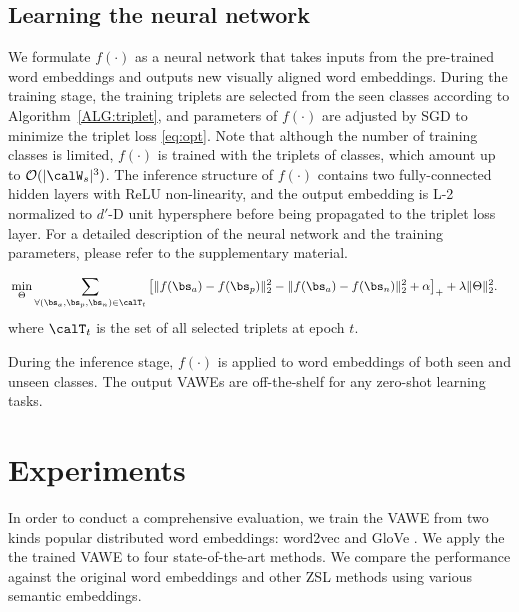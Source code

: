 \documentclass{bmvc2k}
\begin{document}
%


\subsection{Learning the neural network}
We formulate $f(\cdot)$ as a neural network that takes inputs from the pre-trained word embeddings and outputs new visually aligned word embeddings. During the training stage, the training triplets are selected from the seen classes according to Algorithm~\ref{ALG:triplet}, and parameters of $f(\cdot)$ are adjusted by SGD to minimize the triplet loss \eqref{eq:opt}. Note that although the number of training classes is limited, $f(\cdot)$ is trained with the triplets of classes, which amount up to $\mathcal{O} (| \calW_s |^3)$. The inference structure of $f(\cdot)$ contains two fully-connected hidden layers with ReLU non-linearity, and the output embedding is L-2 normalized to $d'$-D unit hypersphere before being propagated to the triplet loss layer. For a detailed description of the neural network and the training parameters, please refer to the supplementary material.

\begin{align}\label{eq:opt}
& \min_{\Theta} \sum_{\forall (\bs_a, \bs_p, \bs_n) \in \calT_t} \left[  \|f(\bs_a) - f(\bs_p) \|_2^2 - \|f(\bs_a) - f(\bs_n) \|_2^2 + \alpha \right]_+  +  \lambda \| \Theta \|_2^2.
\end{align}
where $\calT_t$ is the set of all selected triplets at epoch $t$.


During the inference stage, $f(\cdot)$ is applied to word embeddings of both seen and unseen classes. The output VAWEs are off-the-shelf for any zero-shot learning tasks.

%


%
%
%
%
%
%
%
%
%


%
%
%
%
%
%

%




\section{Experiments}
\label{sec: exp}
In order to conduct a comprehensive evaluation, we train the VAWE from two kinds popular distributed word embeddings: word2vec \cite{word2vec} and GloVe \cite{glove}. We apply the the trained VAWE to four state-of-the-art methods. We compare the performance against the original word embeddings and other ZSL methods using various semantic embeddings. %
\end{document}
